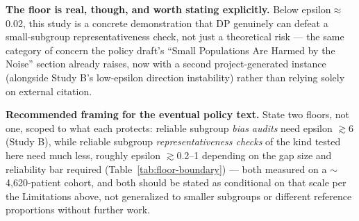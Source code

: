 \documentclass[11pt]{article}
\begin{document}
\textbf{The floor is real, though, and worth stating explicitly.} Below epsilon$\approx$0.02, this study is a concrete demonstration that DP genuinely can defeat a small-subgroup representativeness check, not just a theoretical risk --- the same category of concern the policy draft's ``Small Populations Are Harmed by the Noise'' section already raises, now with a second project-generated instance (alongside Study B's low-epsilon direction instability) rather than relying solely on external citation.

\textbf{Recommended framing for the eventual policy text.} State two floors, not one, scoped to what each protects: reliable subgroup \emph{bias audits} need epsilon $\gtrsim$6 (Study B), while reliable subgroup \emph{representativeness checks} of the kind tested here need much less, roughly epsilon $\gtrsim$0.2--1 depending on the gap size and reliability bar required (Table~\ref{tab:floor-boundary}) --- both measured on a $\sim$4,620-patient cohort, and both should be stated as conditional on that scale per the Limitations above, not generalized to smaller subgroups or different reference proportions without further work.
\end{document}

